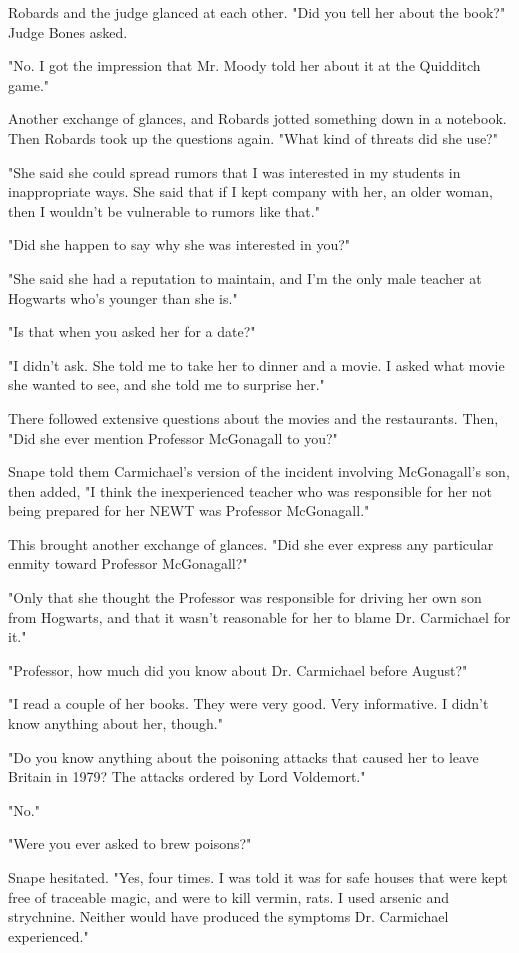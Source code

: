 Robards and the judge glanced at each other. "Did you tell her about the book?" Judge Bones asked.

"No. I got the impression that Mr. Moody told her about it at the Quidditch game."

Another exchange of glances, and Robards jotted something down in a notebook. Then Robards took up the questions again. "What kind of threats did she use?"

"She said she could spread rumors that I was interested in my students in inappropriate ways. She said that if I kept company with her, an older woman, then I wouldn't be vulnerable to rumors like that."

"Did she happen to say why she was interested in you?"

"She said she had a reputation to maintain, and I'm the only male teacher at Hogwarts who's younger than she is."

"Is that when you asked her for a date?"

"I didn't ask. She told me to take her to dinner and a movie. I asked what movie she wanted to see, and she told me to surprise her."

There followed extensive questions about the movies and the restaurants. Then, "Did she ever mention Professor McGonagall to you?"

Snape told them Carmichael's version of the incident involving McGonagall's son, then added, "I think the inexperienced teacher who was responsible for her not being prepared for her NEWT was Professor McGonagall."

This brought another exchange of glances. "Did she ever express any particular enmity toward Professor McGonagall?"

"Only that she thought the Professor was responsible for driving her own son from Hogwarts, and that it wasn't reasonable for her to blame Dr. Carmichael for it."

"Professor, how much did you know about Dr. Carmichael before August?"

"I read a couple of her books. They were very good. Very informative. I didn't know anything about her, though."

"Do you know anything about the poisoning attacks that caused her to leave Britain in 1979? The attacks ordered by Lord Voldemort."

"No."

"Were you ever asked to brew poisons?"

Snape hesitated. "Yes, four times. I was told it was for safe houses that were kept free of traceable magic, and were to kill vermin, rats. I used arsenic and strychnine. Neither would have produced the symptoms Dr. Carmichael experienced."

